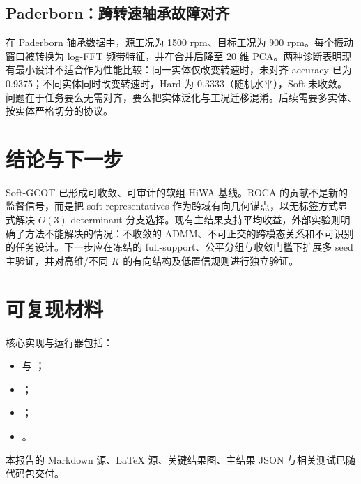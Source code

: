 \documentclass[UTF8,a4paper,11pt]{ctexart}
\begin{document}
\subsection{Paderborn：跨转速轴承故障对齐}
在 Paderborn 轴承数据中，源工况为 1500 rpm、目标工况为 900 rpm。每个振动窗口被转换为 log-FFT 频带特征，并在合并后降至 20 维 PCA。两种诊断表明现有最小设计不适合作为性能比较：同一实体仅改变转速时，未对齐 accuracy 已为 0.9375；不同实体同时改变转速时，Hard 为 0.3333（随机水平），Soft 未收敛。问题在于任务要么无需对齐，要么把实体泛化与工况迁移混淆。后续需要多实体、按实体严格切分的协议。

\section{结论与下一步}
Soft-GCOT 已形成可收敛、可审计的软组 HiWA 基线。ROCA 的贡献不是新的监督信号，而是把 soft representatives 作为跨域有向几何锚点，以无标签方式显式解决 $O(3)$ determinant 分支选择。现有主结果支持平均收益，外部实验则明确了方法不能解决的情况：不收敛的 ADMM、不可正交的跨模态关系和不可识别的任务设计。下一步应在冻结的 full-support、公平分组与收敛门槛下扩展多 seed 主验证，并对高维/不同 $K$ 的有向结构及低置信规则进行独立验证。

\section*{可复现材料}
核心实现与运行器包括：
\begin{itemize}
\item {} 与 ；
\item {}；
\item {}；
\item {}。
\end{itemize}
本报告的 Markdown 源、LaTeX 源、关键结果图、主结果 JSON 与相关测试已随代码包交付。
\end{document}
